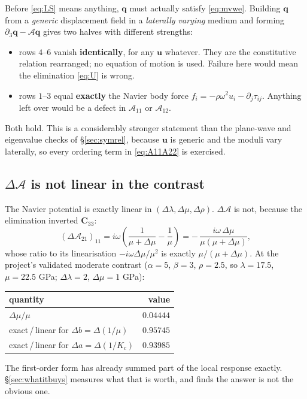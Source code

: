\documentclass[11pt,a4paper]{article}
\newcommand{\bC}{\mathbf{C}}
\newcommand{\bq}{\mathbf{q}}
\newcommand{\bu}{\mathbf{u}}
\newcommand{\Aop}{\mathcal{A}}
\newcommand{\dA}{\Delta\mathcal{A}}
\begin{document}
Before \eqref{eq:LS} means anything, $\bq$ must actually satisfy
\eqref{eq:mvwe}.  Building $\bq$ from a \emph{generic} displacement field in a
\emph{laterally varying} medium and forming $\partial_3\bq - \Aop\bq$ gives two
halves with different strengths:
\begin{itemize}
\item rows $4$--$6$ vanish \textbf{identically}, for any $\bu$ whatever.  They
      are the constitutive relation rearranged; no equation of motion is used.
      Failure here would mean the elimination \eqref{eq:U} is wrong.
\item rows $1$--$3$ equal \textbf{exactly} the Navier body force
      $f_i = -\rho\omega^2 u_i - \partial_j\tau_{ij}$.  Anything left over would
      be a defect in $\Aop_{11}$ or $\Aop_{12}$.
\end{itemize}
Both hold.  This is a considerably stronger statement than the plane-wave and
eigenvalue checks of \S\ref{sec:symrel}, because $\bu$ is generic and the
moduli vary laterally, so every ordering term in \eqref{eq:A11A22} is exercised.

\subsection{\texorpdfstring{$\dA$}{DeltaA} is not linear in the contrast}
\label{sec:nonlinear}

The Navier potential is exactly linear in $(\Delta\lambda,\Delta\mu,\Delta\rho)$.
$\dA$ is not, because the elimination inverted $\bC_{33}$:
\begin{equation}\label{eq:resum}
  (\dA_{21})_{11} = i\omega\left(\frac{1}{\mu+\Delta\mu} - \frac{1}{\mu}\right)
  = -\,\frac{i\omega\,\Delta\mu}{\mu(\mu+\Delta\mu)},
\end{equation}
whose ratio to its linearisation $-i\omega\Delta\mu/\mu^2$ is exactly
$\mu/(\mu+\Delta\mu)$.  At the project's validated moderate contrast
($\alpha = 5$, $\beta = 3$, $\rho = 2.5$, so $\lambda = 17.5$, $\mu = 22.5$ GPa;
$\Delta\lambda = 2$, $\Delta\mu = 1$ GPa):
\begin{center}
\begin{tabular}{lr}
\toprule
quantity & value\\
\midrule
$\Delta\mu/\mu$ & $0.04444$\\
exact\,/\,linear for $\Delta b = \Delta(1/\mu)$ & $0.95745$\\
exact\,/\,linear for $\Delta a = \Delta(1/K_c)$ & $0.93985$\\
\bottomrule
\end{tabular}
\end{center}
The first-order form has already summed part of the local response exactly.
\S\ref{sec:whatitbuys} measures what that is worth, and finds the answer is not
the obvious one.
\end{document}
